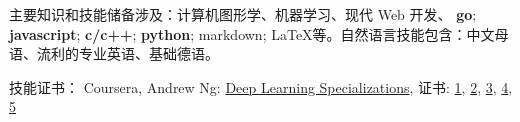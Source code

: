 {{主要知识和技能储备涉及：计算机图形学、机器学习、现代 Web 开发、
\textbf{go}; \textbf{javascript}; \textbf{c/c++}; \textbf{python};
markdown; \LaTeX 等。自然语言技能包含：中文母语、流利的专业英语、基础德语。
}
\item{
技能证书：
Coursera, Andrew Ng: \href{https://www.coursera.org/account/accomplishments/specialization/QGH8ZVJ6J2L2}{Deep Learning Specializations}, 证书:
\href{https://www.coursera.org/account/accomplishments/verify/YH4NT7HHN263}{1},
\href{https://www.coursera.org/account/accomplishments/verify/QGH3GNGF6BM4}{2},
\href{https://www.coursera.org/account/accomplishments/verify/6VU45R2SZEF6}{3},
\href{https://www.coursera.org/account/accomplishments/verify/LF3K9BQQDLVL}{4},
\href{https://www.coursera.org/account/accomplishments/verify/JQFLW2DPYAGW}{5}
}
\resumeSubHeadingListEnd
}